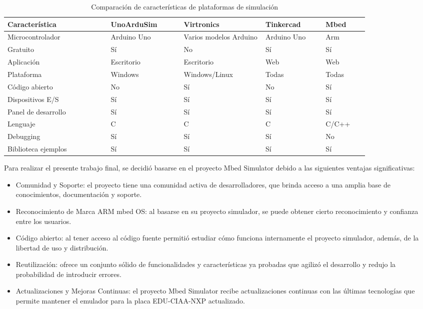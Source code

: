 \begin{table}[h]
\centering
\caption[Comparación de características de plataformas de simulación]{Comparación de características de plataformas de simulación}
\begin{tabular}{p{0.24\linewidth} p{0.17\linewidth}  p{0.19\linewidth}  p{0.14\linewidth}  p{0.10\linewidth}}
\toprule
\textbf{Característica} 
& \textbf{UnoArduSim}
& \textbf{Virtronics}
& \textbf{Tinkercad}
& \textbf{Mbed}
\\
\midrule
Microcontrolador & Arduino Uno & Varios modelos Arduino & Arduino Uno & Arm\\
Gratuito &    Sí & No & Sí & Sí\\
Aplicación & Escritorio & Escritorio & Web & Web\\
Plataforma & Windows & Windows/Linux & Todas & Todas\\
Código abierto & No & Sí & No & Sí\\
Dispositivos E/S & Sí & Sí & Sí & Sí  \\
Panel de desarrollo & Sí & Sí & Sí & Sí \\
Lenguaje & C & C & C & C/C++\\
Debugging & Sí & Sí & Sí & No\\
Biblioteca ejemplos & Sí & Sí & Sí & Sí\\
\bottomrule
\hline
\end{tabular}
\label{tab:simuladores}
\end{table}


Para realizar el presente trabajo final, se decidió basarse en el proyecto Mbed Simulator debido a las siguientes ventajas significativas:

\begin{itemize}
	\item Comunidad y Soporte: el proyecto tiene una comunidad activa de desarrolladores, que brinda acceso a una amplia base de conocimientos, documentación y soporte. 
	\item Reconocimiento de Marca ARM mbed OS: al basarse en su proyecto simulador, se puede obtener cierto reconocimiento y confianza entre los usuarios.
	\item Código abierto: al tener acceso al código fuente permitió estudiar cómo funciona internamente el proyecto simulador, además, de la libertad de uso y distribución.
	\item Reutilización: ofrece un conjunto sólido de funcionalidades y características ya probadas que agilizó el desarrollo y redujo la probabilidad de introducir errores.
	\item Actualizaciones y Mejoras Continuas: el proyecto Mbed Simulator recibe actualizaciones continuas con las últimas tecnologías que permite mantener el emulador para la placa EDU-CIAA-NXP actualizado.
	
\end{itemize}



